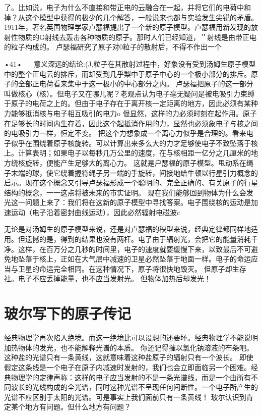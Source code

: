 了。比如说，电子为什么不直接和带正电的云融合在一起，并将它们的电荷中和掉？从这个模型中获得的极少的几个解答，一般说来也都与实验发生尖锐的矛盾。
1911年，著名英国物理学家卢瑟福提出了一个新的原子模型。卢瑟福用新发现的放射性物质的G射线去轰击各种物质的原子。那时人们已经知道，＂射线是由带正电的粒子构成的。
卢瑟福研究了原子对0粒子的散射后，不得不作出一个

•41•
  
意义深远的结论:(J,粒子在其散射过程中，好象没有受到汤姆生原子模型中的整个正电云的排斥，而却受到几乎梨中于原子中心的一个极小部分的排斥。原子的全部正电荷看来集中于这一极小的中心部分之内。
卢瑟福把原子的这一部分叫做核心（核）。但电子又在哪儿呢？老观点认为电子亳无疑问是被电吸引力束缚于原子的电荷之上的。但由于电子存在于离开核一定距离的地方，因此必须有某种力能够抵消核与电子相互吸引的电力o
佷显然，这样的力必须时刻在起作用。原子在足够长的时间内生存着，因此这个起抵消作用的力，显然也必须象电子与核之间的电吸引力一样，恒定不变。
把这个力想象成一个离心力似乎是合理的。看来电子似乎在围绕着原子核旋转。可以计算出来多么大的力才足够使电子不致坠落于核上。计算表明；如果电子以每秒几万公里的速度，在与核相距一亿分之几厘米的地方绕核旋转，便能产生足够大的离心力。
这就是户瑟福的原子模型。甩动系在绳子末端的球，使它绕着握符绳子另一端的手旋转，间接地给牛顿以行星引力概念的启示。现在这个概念又引导卢瑟福形成一个聪明的、完全正确的、有关原子的行星结构的概念，一一这点将被未来的市实证明。
现在我们能够回到物体为什么会发光这一问题上来了：我们将在这新的原子模型中寻找答案。电子围绕核的运动是加速运动（电子沿着密封曲线运动），因此必然辐射电磁波c

无论是对汤姆生的原子模型来说，还是对卢瑟福的秧型来说，经典定律都同样地适用。但遗憾的是，得到的结果也没有两杆。电了由于辐射光，会把它的能量消耗千净。这样，在百万分之几秒的时间里，电子的速度就要缓慢下来，以致最后不可避免地坠落于核上，正如在大气层中减速的卫星必然坠落于地面一样。电子的命运应当与卫星的命运完全相同。在这种情况下，原子将很快地毁灭。
但原子却生存社。电子不应丢掉能量，也不应当发射光。
但物体加热后却发光！

\section{玻尔写下的原子传记}

经典物理学再次陷入绝境。而这一绝境比可以设想的还要坏。经典物理学不能说明加热物体的发光，也不能解释光谱的本质。
你还记得摧以氯化钠溶液的布条吧。这种盐的光谱只有一条黄线，这就意味着这种盐原子的辐射只有一个波长。
即使假定这条线是一个电子在原子内减速时发射的，我们也会立即面临另一个困难。经典物理学的定律声称：这样的电子应当发射的不是一条光谱线，而是一个由所有不同波长的光线构成的全光谱，同时这种光谱不呈现任何间断性。一个电子所产生的光谱不应区别于太阳的光谱。可是事实上我们面前只有一条黄线！
玻尔认识到肯定某个地方有问题。但什么地方有问题？

